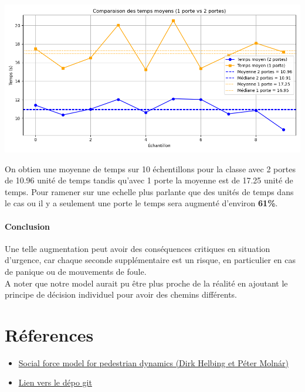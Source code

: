 \documentclass[a4paper,12pt]{article}
\begin{document}
\includegraphics[width=\textwidth]{resultat_2.png} %

On obtien une moyenne de temps sur 10 échentillons pour la classe avec 2 portes de 10.96 unité de temps tandis qu'avec 1 porte la moyenne est de 17.25 unité de temps. Pour ramener sur une echelle plus parlante que des unités de temps dans le cas ou il y a seulement une porte le temps sera augmenté d'environ \textbf{61\%}. 
\paragraph{Conclusion}  Une telle augmentation peut avoir des conséquences critiques en situation d'urgence, car chaque seconde supplémentaire est un risque, en particulier en cas de panique ou de mouvements de foule. \\ \indent A noter que notre model aurait pu être plus proche de la réalité en ajoutant le principe de décision individuel pour avoir des chemins différents.
\newpage



\section{Réferences}


\vspace{1em}

\begin{itemize}
	\item \href{https://journals.aps.org/pre/abstract/10.1103/PhysRevE.51.4282}{Social force model for pedestrian dynamics (Dirk Helbing et Péter Molnár)}
	\item \href{https://github.com/antoninnad/etude_des_foules}{Lien vers le dépo git}
\end{itemize}
\end{document}
